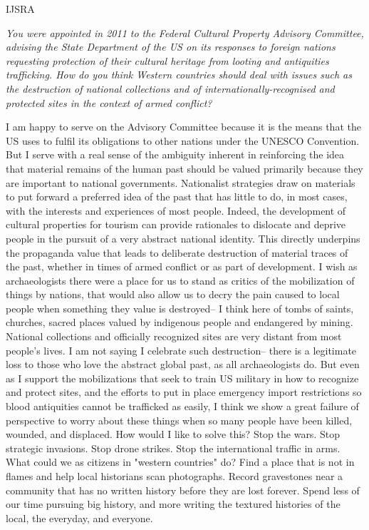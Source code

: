 \begin{labeling}{IJSRA}
\item[IJSRA] \emph{You were appointed in 2011 to the Federal Cultural Property Advisory Committee, advising the State Department of the US on its responses to foreign nations requesting protection of their cultural heritage from looting and antiquities trafficking. How do you think Western countries should deal with issues such as the destruction of national collections and of internationally-recognised and protected sites in the context of armed conflict?}

\item[RAJ] I am happy to serve on the Advisory Committee because it is the means that the US uses to fulfil its obligations to other nations under the UNESCO Convention. But I serve with a real sense of the ambiguity inherent in reinforcing the idea that material remains of the human past should be valued primarily because they are important to national governments. Nationalist strategies draw on materials to put forward a preferred idea of the past that has little to do, in most cases, with the interests and experiences of most people. Indeed, the development of cultural properties for tourism can provide rationales to dislocate and deprive people in the pursuit of a very abstract national identity. This directly underpins the propaganda value that leads to deliberate destruction of material traces of the past, whether in times of armed conflict or as part of development. I wish as archaeologists there were a place for us to stand as critics of the mobilization of things by nations, that would also allow us to decry the pain caused to local people when something they value is destroyed-- I think here of tombs of saints, churches, sacred places valued by indigenous people and endangered by mining. National collections and officially recognized sites are very distant from most people's lives. I am not saying I celebrate such destruction-- there is a legitimate loss to those who love the abstract global past, as all archaeologists do. But even as I support the mobilizations that seek to train US military in how to recognize and protect sites, and the efforts to put in place emergency import restrictions so blood antiquities cannot be trafficked as easily, I think we show a great failure of perspective to worry about these things when so many people have been killed, wounded, and displaced. How would I like to solve this? Stop the wars. Stop strategic invasions. Stop drone strikes. Stop the international traffic in arms. What could we as citizens in "western countries" do? Find a place that is not in flames and help local historians scan photographs. Record gravestones near a community that has no written history before they are lost forever. Spend less of our time pursuing big history, and more writing the textured histories of the local, the everyday, and everyone.


\end{labeling}
